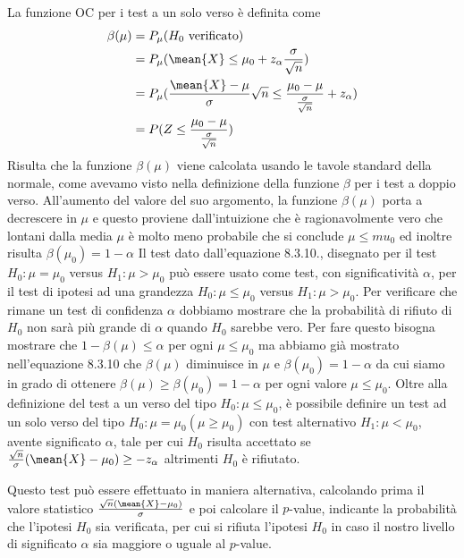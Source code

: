 La funzione OC per i test a un solo verso è definita come
\[  \begin{split}
    \beta(\mu) & = P_{\mu}(H_0 \mbox{ verificato}) \\
               & = P_{\mu}(\mean{X} \leq \mu_0 + z_{\alpha}\frac{\sigma}{\sqrt{n}}) \\
               & = P_{\mu}(\frac{\mean{X} - \mu}{\sigma}{\sqrt{n}} \leq \frac{\mu_0 - \mu}{\frac{\sigma}{\sqrt{n}}} + z_{\alpha})\\
               & = P(Z \leq \frac{\mu_0 - \mu}{\frac{\sigma}{\sqrt{n}}}) \\
    \end{split} \]
Risulta che la funzione $\beta(\mu)$ viene calcolata usando le tavole standard della normale, come avevamo visto nella
definizione della funzione $\beta$ per i test a doppio verso.\newline
All'aumento del valore del suo argomento, la funzione $\beta(\mu)$ porta a decrescere in $\mu$ e questo proviene
dall'intuizione che è ragionavolmente vero che lontani dalla media $\mu$ è molto meno probabile che si conclude $\mu \leq mu_0$
ed inoltre risulta $\beta(\mu_0) = 1 - \alpha$
Il test dato dall'equazione 8.3.10., disegnato per il test $H_0:\mu = \mu_0$ versus $H_1:\mu > \mu_0$ può essere usato
come test, con significatività $\alpha$, per il test di ipotesi ad una grandezza $H_0:\mu \leq \mu_0$ versus $H_1: \mu > \mu_0$.\newline
Per verificare che rimane un test di confidenza $\alpha$ dobbiamo mostrare che la probabilità di rifiuto di $H_0$ non
sarà più grande di $\alpha$ quando $H_0$ sarebbe vero.\newline
Per fare questo bisogna mostrare che $1 - \beta(\mu) \leq \alpha$ per ogni $\mu \leq \mu_0$ ma abbiamo già mostrato
nell'equazione 8.3.10 che $\beta(\mu)$ diminuisce in $\mu$ e $\beta(\mu_0) = 1 - \alpha$ da cui siamo in grado di
ottenere $\beta(\mu) \geq \beta(\mu_0) = 1 - \alpha$ per ogni valore $\mu \leq \mu_0$.\newline
Oltre alla definizione del test a un verso del tipo $H_0:\mu \leq \mu_0$, è possibile definire un test ad un solo verso 
del tipo $H_0:\mu = \mu_0(\mu \geq \mu_0)$ con test alternativo $H_1:\mu < \mu_0$, avente significato $\alpha$, tale per
cui $H_0$ risulta accettato se $\frac{\sqrt{n}}{\sigma} (\mean{X} - \mu_0) \geq -z_{\alpha}$ altrimenti $H_0$ è rifiutato.

Questo test può essere effettuato in maniera alternativa, calcolando prima il valore statistico $\frac{\sqrt{n}(\mean{X} -
\mu_0)}{\sigma}$ e poi calcolare il $p$-value, indicante la probabilità che l'ipotesi $H_0$ sia verificata, per cui si
rifiuta l'ipotesi $H_0$ in caso il nostro livello di significato $\alpha$ sia maggiore o uguale al $p$-value.

